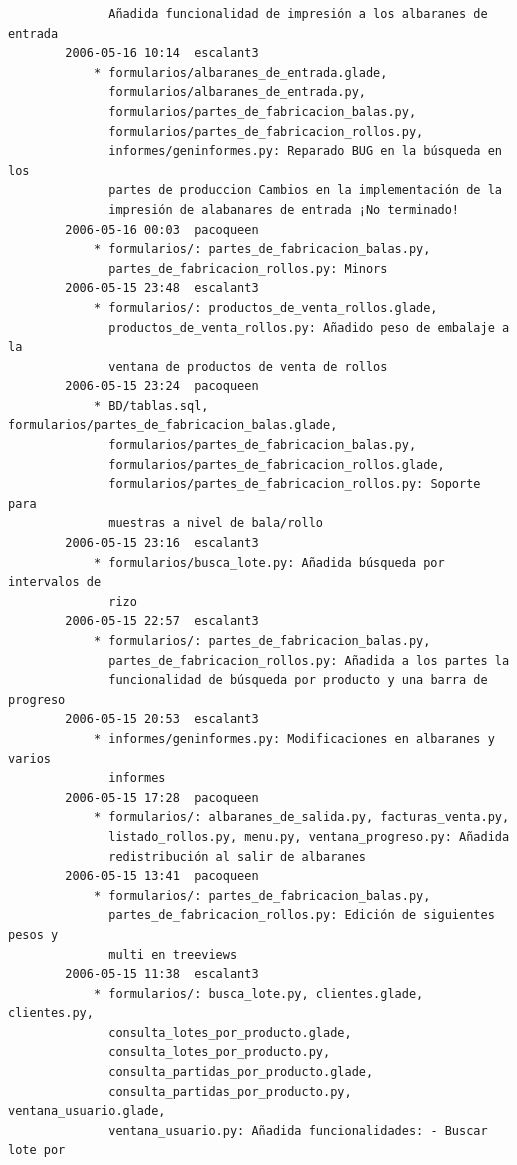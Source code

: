 \documentclass[a4paper]{article}
\begin{document}
\begin{verbatim}
              Añadida funcionalidad de impresión a los albaranes de entrada
        2006-05-16 10:14  escalant3
            * formularios/albaranes_de_entrada.glade,
              formularios/albaranes_de_entrada.py,
              formularios/partes_de_fabricacion_balas.py,
              formularios/partes_de_fabricacion_rollos.py,
              informes/geninformes.py: Reparado BUG en la búsqueda en los
              partes de produccion Cambios en la implementación de la
              impresión de alabanares de entrada ¡No terminado!
        2006-05-16 00:03  pacoqueen
            * formularios/: partes_de_fabricacion_balas.py,
              partes_de_fabricacion_rollos.py: Minors
        2006-05-15 23:48  escalant3
            * formularios/: productos_de_venta_rollos.glade,
              productos_de_venta_rollos.py: Añadido peso de embalaje a la
              ventana de productos de venta de rollos
        2006-05-15 23:24  pacoqueen
            * BD/tablas.sql, formularios/partes_de_fabricacion_balas.glade,
              formularios/partes_de_fabricacion_balas.py,
              formularios/partes_de_fabricacion_rollos.glade,
              formularios/partes_de_fabricacion_rollos.py: Soporte para
              muestras a nivel de bala/rollo
        2006-05-15 23:16  escalant3
            * formularios/busca_lote.py: Añadida búsqueda por intervalos de
              rizo
        2006-05-15 22:57  escalant3
            * formularios/: partes_de_fabricacion_balas.py,
              partes_de_fabricacion_rollos.py: Añadida a los partes la
              funcionalidad de búsqueda por producto y una barra de progreso
        2006-05-15 20:53  escalant3
            * informes/geninformes.py: Modificaciones en albaranes y varios
              informes
        2006-05-15 17:28  pacoqueen
            * formularios/: albaranes_de_salida.py, facturas_venta.py,
              listado_rollos.py, menu.py, ventana_progreso.py: Añadida
              redistribución al salir de albaranes
        2006-05-15 13:41  pacoqueen
            * formularios/: partes_de_fabricacion_balas.py,
              partes_de_fabricacion_rollos.py: Edición de siguientes pesos y
              multi en treeviews
        2006-05-15 11:38  escalant3
            * formularios/: busca_lote.py, clientes.glade, clientes.py,
              consulta_lotes_por_producto.glade,
              consulta_lotes_por_producto.py,
              consulta_partidas_por_producto.glade,
              consulta_partidas_por_producto.py, ventana_usuario.glade,
              ventana_usuario.py: Añadida funcionalidades: - Buscar lote por

\end{verbatim}
\end{document}
